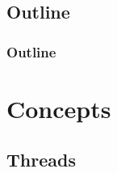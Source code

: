 \documentclass{beamer}
\begin{document}
\subsection*{Outline}

\begin{frame}
  \frametitle{Outline}
  \tableofcontents[hideallsubsections]
\end{frame}

\section[Concepts]{Concepts}

\subsection[Threads]{Threads}
\end{document}
